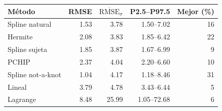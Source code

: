 \begin{tabular}{@{}l r r r r@{}}
\toprule
Método & RMSE & $\overline{\mathrm{RMSE}}_{\sigma}$ & P2.5--P97.5 & Mejor (\%) \\
\midrule
Spline natural & 1.53 & 3.78 & 1.50--7.02 & 16 \\
Hermite & 2.08 & 3.83 & 1.85--6.42 & 22 \\
Spline sujeta & 1.85 & 3.87 & 1.67--6.99 & 9 \\
PCHIP & 2.37 & 4.04 & 2.20--6.60 & 10 \\
Spline not-a-knot & 1.04 & 4.17 & 1.18--8.46 & 31 \\
Lineal & 3.79 & 4.78 & 3.43--6.44 & 5 \\
Lagrange & 8.48 & 25.99 & 1.05--72.68 & 6 \\
\bottomrule
\end{tabular}
